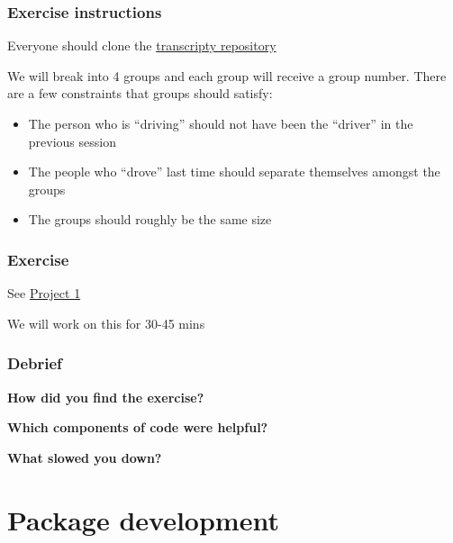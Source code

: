 \documentclass[10pt]{beamer}
\begin{document}
  \begin{frame} \frametitle{Exercise instructions}

    Everyone should clone the
    \href{https://github.com/cc7768/transcripty}{transcripty repository}

    \vspace{0.25cm}

    We will break into 4 groups and each group will receive a group number. There are a
    few constraints that groups should satisfy:

    \begin{itemize}
      \item The person who is ``driving'' should not have been the ``driver'' in the
        previous session
      \item The people who ``drove'' last time should separate themselves amongst the
        groups
      \item The groups should roughly be the same size
    \end{itemize}

  \end{frame}

  \begin{frame} \frametitle{Exercise}

    See \href{https://github.com/nyupredocs/modularizationandtesting/blob/master/Projects/Project_1_HendricksLeukhina.md}{Project 1}

    \vspace{0.25cm}

    We will work on this for 30-45 mins

  \end{frame}

  \begin{frame} \frametitle{Debrief}

    \textbf{How did you find the exercise?}

    \vspace{0.25cm}

    \textbf{Which components of code were helpful?}

    \vspace{0.25cm}

    \textbf{What slowed you down?}

  \end{frame}



\section{Package development}
\end{document}
